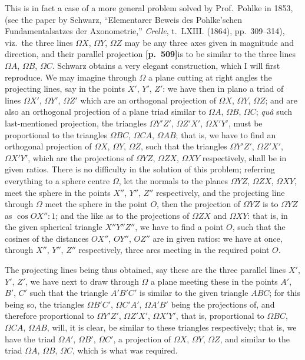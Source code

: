 \documentclass[11pt,a4paper]{article}
\begin{document}
This is in fact a case of a more general problem solved by Prof.~Pohlke in 1853, (see the paper by Schwarz, ``Elementarer Beweis des Pohlke'schen Fundamentalsatzes der Axonometrie,'' \textit{Crelle}, t.~LXIII. (1864), pp.~309--314), viz.\ the three lines $\Omega X$, $\Omega Y$, $\Omega Z$ may be any three axes given in magnitude and direction, and their parallel projection \noindent\textbf{[p.~509]}\quad is to be similar to the three lines $\Omega A$, $\Omega B$, $\Omega C$. Schwarz obtains a very elegant construction, which I will first reproduce. We may imagine through $\Omega$ a plane cutting at right angles the projecting lines, say in the points $X'$, $Y'$, $Z'$: we have then in plano a triad of lines $\Omega X'$, $\Omega Y'$, $\Omega Z'$ which are an orthogonal projection of $\Omega X$, $\Omega Y$, $\Omega Z$; and are also an orthogonal projection of a plane triad similar to $\Omega A$, $\Omega B$, $\Omega C$; \textit{qu\^a} such last-mentioned projection, the triangles $\Omega Y'Z'$, $\Omega Z'X'$, $\Omega X'Y'$, must be proportional to the triangles $\Omega BC$, $\Omega CA$, $\Omega AB$; that is, we have to find an orthogonal projection of $\Omega X$, $\Omega Y$, $\Omega Z$, such that the triangles $\Omega Y'Z'$, $\Omega Z'X'$, $\Omega X'Y'$, which are the projections of $\Omega YZ$, $\Omega ZX$, $\Omega XY$ respectively, shall be in given ratios. There is no difficulty in the solution of this problem; referring everything to a sphere centre $\Omega$, let the normals to the planes $\Omega YZ$, $\Omega ZX$, $\Omega XY$, meet the sphere in the points $X''$, $Y''$, $Z''$ respectively, and the projecting line through $\Omega$ meet the sphere in the point $O$, then the projection of $\Omega YZ$ is to $\Omega YZ$ as $\cos OX'' : 1$; and the like as to the projections of $\Omega ZX$ and $\Omega XY$: that is, in the given spherical triangle $X''Y''Z''$, we have to find a point $O$, such that the cosines of the distances $OX''$, $OY''$, $OZ''$ are in given ratios: we have at once, through $X''$, $Y''$, $Z''$ respectively, three arcs meeting in the required point $O$.

The projecting lines being thus obtained, say these are the three parallel lines $X'$, $Y'$, $Z'$, we have next to draw through $\Omega$ a plane meeting these in the points $A'$, $B'$, $C'$ such that the triangle $A'B'C'$ is similar to the given triangle $ABC$; for this being so, the triangles $\Omega B'C'$, $\Omega C'A'$, $\Omega A'B'$ being the projections of, and therefore proportional to $\Omega Y'Z'$, $\Omega Z'X'$, $\Omega X'Y'$, that is, proportional to $\Omega BC$, $\Omega CA$, $\Omega AB$, will, it is clear, be similar to these triangles respectively; that is, we have the triad $\Omega A'$, $\Omega B'$, $\Omega C'$, a projection of $\Omega X$, $\Omega Y$, $\Omega Z$, and similar to the triad $\Omega A$, $\Omega B$, $\Omega C$, which is what was required.
\end{document}
